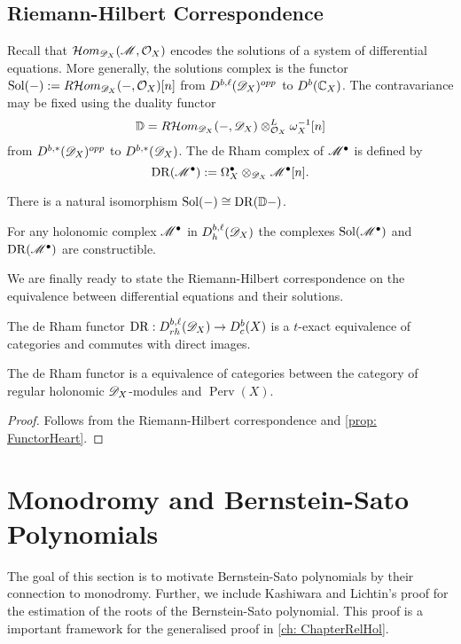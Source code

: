 \subsection{Riemann-Hilbert Correspondence}
  Recall that $\mathcal{H}om_{\mathscr{D}_X}(\mathscr{M}, \mathcal{O}_X)$ encodes the solutions of a system of differential equations.
  More generally, the solutions complex is the functor $\operatorname{Sol}({-}) := R \mathcal{H}om_{\mathscr{D}_X}({-},\mathcal{O}_X)[n]$ from $D^{b,\ell}(\mathscr{D}_X)^{opp}$ to $D^{b}(\mathbb{C}_X)$.
  The contravariance may be fixed using the duality functor
  $$\mathbb{D} = R\mathcal{H}om_{\mathscr{D}_X}({-},\mathscr{D}_X)\otimes_{\mathcal{O}_X}^L\omega_X^{-1}[n]$$
  from $D^{b,*}(\mathscr{D}_X)^{opp}$ to $D^{b,*}(\mathscr{D}_X)$.
  The de Rham complex of $\mathscr{M}^\bullet$ is defined by
  $$\operatorname{DR}(\mathscr{M}^\bullet):=\Omega_X^\bullet \otimes_{\mathscr{D}_X} \mathscr{M}^\bullet[n]. $$
  \begin{proposition}{\cite[Theorem 5.3.1. ]{dimca2004sheaves}}
    There is a natural isomorphism $\operatorname{Sol}({-}) \cong \operatorname{DR}(\mathbb{D}{-})$.
  \end{proposition}
  \begin{proposition}{\cite[Theorem 5.3.1.]{dimca2004sheaves}}
    For any holonomic complex $\mathscr{M}^\bullet$ in $D_h^{b,\ell}(\mathscr{D}_X)$ the complexes $\operatorname{Sol}(\mathscr{M}^\bullet)$ and $\operatorname{DR}(\mathscr{M}^\bullet)$ are constructible.
  \end{proposition}
  We are finally ready to state the Riemann-Hilbert correspondence on the equivalence between differential equations and their solutions.
  \begin{theorem}
    The de Rham functor $\operatorname{DR}:D_{rh}^{b,\ell}(\mathscr{D}_X)\allowbreak \to D_c^b(X)$ is a $t$-exact equivalence of categories and commutes with direct images.
  \end{theorem}
  \begin{corollary}
    The de Rham functor is a equivalence of categories between the category of regular holonomic $\mathscr{D}_X$-modules and $\operatorname{Perv}(X)$.
  \end{corollary}
  \begin{proof}
    Follows from the Riemann-Hilbert correspondence and \cref{prop: FunctorHeart}.
  \end{proof}
\section{Monodromy and Bernstein-Sato Polynomials}\label{sec: MonodromyBS}
The goal of this section is to motivate Bernstein-Sato polynomials by their connection to monodromy.
Further, we include Kashiwara and Lichtin's proof for the estimation of the roots of the Bernstein-Sato polynomial.
This proof is a important framework for the generalised proof in \cref{ch: ChapterRelHol}.


